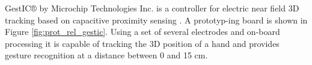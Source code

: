 GestIC® by Microchip Technologies Inc. is a controller for electric near field 3D tracking based on capacitive proximity sensing \cite{microchip2013}. A prototyp-ing board is shown in Figure \ref{fig:prot_rel_gestic}. Using a set of several electrodes and on-board processing it is capable of tracking the 3D position of a hand and provides gesture recognition at a distance between 0 and 15 cm. 
